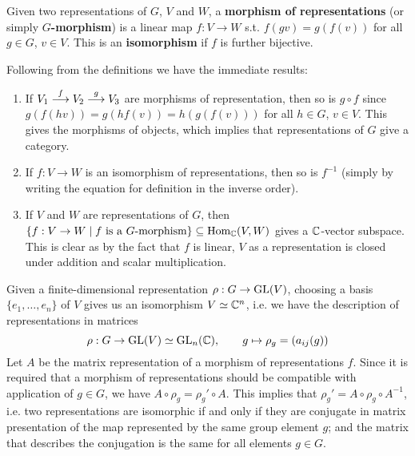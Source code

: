 \documentclass{article}
\begin{document}
\begin{definition}
    Given two representations of $G$, $V$ and $W$, a \textbf{morphism of representations} (or simply \textbf{$G$-morphism}) is a linear map $f: V \to W$ s.t. $f(gv) = g(f(v))$ for all $g \in G$, $v \in V$. This is an \textbf{isomorphism} if $f$ is further bijective.  
\end{definition}

\begin{remark}
    Following from the definitions we have the immediate results:
    \begin{enumerate}[label=\arabic*)]
        \item If $V_1 \overset{f}{\longrightarrow} V_2 \overset{g}{\longrightarrow} V_3$ are morphisms of representation, then so is $g \circ f$ since $g(f(hv)) = g(hf(v)) = h(g(f(v)))$ for all $h \in G$, $v \in V$. This gives the morphisms of objects, which implies that representations of $G$ give a category.
        \item If $f: V \to W$ is an isomorphism of representations, then so is $f^{-1}$ (simply by writing the equation for definition in the inverse order).
        \item If $V$ and $W$ are representations of $G$, then $\{ f : V \to W \mid f \text{ is a $G$-morphism} \} \subseteq \mathrm{Hom}_{\mathbb{C}}(V, W)$ gives a $\mathbb{C}$-vector subspace. This is clear as by the fact that $f$ is linear, $V$ as a representation is closed under addition and scalar multiplication.
    \end{enumerate}
\end{remark}

\begin{remark}\label{rmk: repr isom iff conjugate}
    Given a finite-dimensional representation $\rho: G \to \mathrm{GL}(V)$, choosing a basis $\{e_1, \dots, e_n\}$ of $V$ gives us an isomorphism $V \simeq \mathbb{C}^n$, i.e. we have the description of representations in matrices
    \[
        \rho: G \to \mathrm{GL}(V) \simeq \mathrm{GL}_n(\mathbb{C}), \qquad g \mapsto \rho_g = (a_{ij}(g))
    \]
    Let $A$ be the matrix representation of a morphism of representations $f$. Since it is required that a morphism of representations should be compatible with application of $g \in G$, we have $A \circ \rho_g = \rho_g' \circ A$. This implies that $\rho_g' = A \circ \rho_g \circ A^{-1}$, i.e. two representations are isomorphic if and only if they are conjugate in matrix presentation of the map represented by the same group element $g$; and the matrix that describes the conjugation is the same for all elements $g \in G$.
\end{remark}
\end{document}
